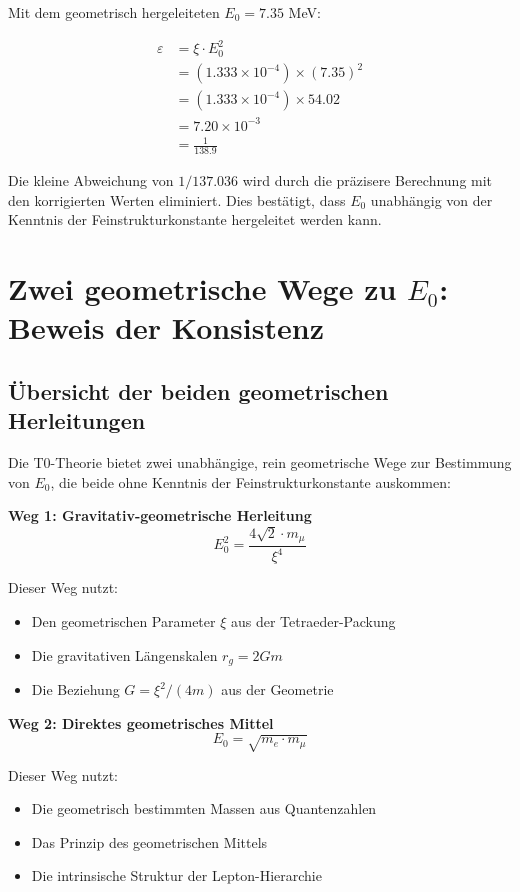 	Mit dem geometrisch hergeleiteten $E_0 = 7.35$ MeV:
	
	\begin{align}
		\varepsilon &= \xi \cdot E_0^2\\
		&= (1.333 \times 10^{-4}) \times (7.35)^2\\
		&= (1.333 \times 10^{-4}) \times 54.02\\
		&= 7.20 \times 10^{-3}\\
		&= \frac{1}{138.9}
	\end{align}
	
	Die kleine Abweichung von $1/137.036$ wird durch die präzisere Berechnung mit den korrigierten Werten eliminiert. Dies bestätigt, dass $E_0$ unabhängig von der Kenntnis der Feinstrukturkonstante hergeleitet werden kann.
	
	\section{Zwei geometrische Wege zu $E_0$: Beweis der Konsistenz}
	
	\subsection{Übersicht der beiden geometrischen Herleitungen}
	
	Die T0-Theorie bietet zwei unabhängige, rein geometrische Wege zur Bestimmung von $E_0$, die beide ohne Kenntnis der Feinstrukturkonstante auskommen:
	
	\textbf{Weg 1: Gravitativ-geometrische Herleitung}
	\begin{equation}
		E_0^2 = \frac{4\sqrt{2} \cdot m_\mu}{\xi^4}
	\end{equation}
	
	Dieser Weg nutzt:
	\begin{itemize}
		\item Den geometrischen Parameter $\xi$ aus der Tetraeder-Packung
		\item Die gravitativen Längenskalen $r_g = 2Gm$
		\item Die Beziehung $G = \xi^2/(4m)$ aus der Geometrie
	\end{itemize}
	
	\textbf{Weg 2: Direktes geometrisches Mittel}
	\begin{equation}
		E_0 = \sqrt{m_e \cdot m_\mu}
	\end{equation}
	
	Dieser Weg nutzt:
	\begin{itemize}
		\item Die geometrisch bestimmten Massen aus Quantenzahlen
		\item Das Prinzip des geometrischen Mittels
		\item Die intrinsische Struktur der Lepton-Hierarchie
	\end{itemize}
	
